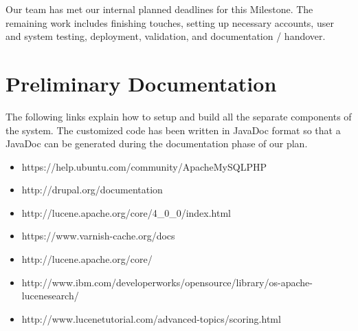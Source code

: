 \documentclass[12pt]{article} %
\begin{document}
Our team has met our internal planned deadlines for this Milestone. The remaining work includes finishing touches, setting up necessary accounts, user and system testing, deployment, validation, and documentation / handover.



\section{Preliminary Documentation}

The following links explain how to setup and build all the separate components of the system. The customized code has been written in JavaDoc format so that a JavaDoc can be generated during the documentation phase of our plan.

\begin{itemize}
\item https://help.ubuntu.com/community/ApacheMySQLPHP
\item http://drupal.org/documentation
\item http://lucene.apache.org/core/4\_0\_0/index.html
\item https://www.varnish-cache.org/docs
\item http://lucene.apache.org/core/
\item http://www.ibm.com/developerworks/opensource/library/os-apache-lucenesearch/
\item http://www.lucenetutorial.com/advanced-topics/scoring.html
\end{itemize}
\end{document}
